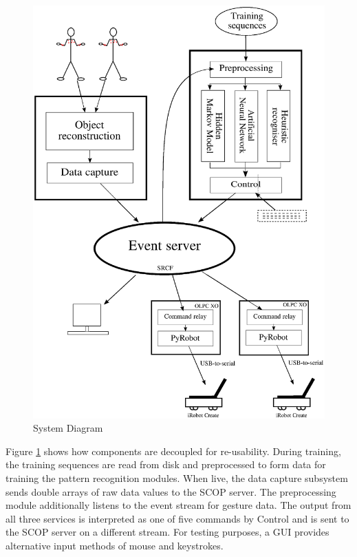 \documentclass[12pt,a4,notitlepage]{report}
\renewcommand{\_}{\texttt{\symbol{95}}}
\newcommand{\<}{\texttt{\symbol{60}}}
\renewcommand{\>}{\texttt{\symbol{62}}}
\begin{document}
\begin{figure}
\centering
\includegraphics[scale=0.6,angle=0]{diagrams/systemdiagram.ps}
\caption{System Diagram}
\label{sysdiag}
\end{figure}

Figure \ref{sysdiag} shows how components are decoupled for re-usability. During training, the training sequences are read from disk and preprocessed to form data for training the pattern recognition modules. When live, the data capture subsystem sends double arrays of raw data values to the SCOP server. The preprocessing module additionally listens to the event stream for gesture data. The output from all three services is interpreted as one of five commands by Control and is sent to the SCOP server on a different stream. For testing purposes, a GUI provides alternative input methods of mouse and keystrokes.
\end{document}
